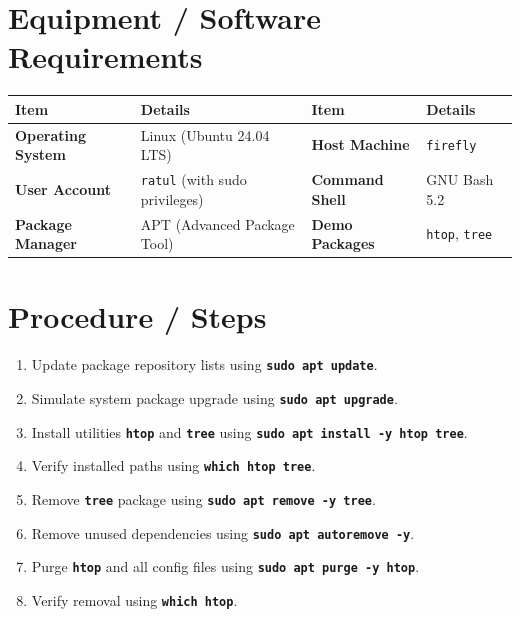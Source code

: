 \documentclass[10pt,a4paper]{article}
\newcommand{\cmd}[1]{\texttt{\textbf{#1}}}
\begin{document}
\section{Equipment / Software Requirements}
\vspace{-2pt}
\begin{table}[h!]
\centering\footnotesize
\renewcommand{\arraystretch}{1.08}
\begin{tabularx}{\linewidth}{lXlX}
\toprule
\textbf{Item} & \textbf{Details} & \textbf{Item} & \textbf{Details} \\
\midrule
\textbf{Operating System} & Linux (Ubuntu 24.04 LTS) & \textbf{Host Machine} & \texttt{firefly} \\
\textbf{User Account} & \texttt{ratul} (with sudo privileges) & \textbf{Command Shell} & GNU Bash 5.2 \\
\textbf{Package Manager} & APT (Advanced Package Tool) & \textbf{Demo Packages} & \texttt{htop}, \texttt{tree} \\
\bottomrule
\end{tabularx}
\end{table}

\section{Procedure / Steps}
\begin{enumerate}[noitemsep,topsep=1pt,leftmargin=1.4em]
  \item Update package repository lists using \cmd{sudo apt update}.
  \item Simulate system package upgrade using \cmd{sudo apt upgrade}.
  \item Install utilities \cmd{htop} and \cmd{tree} using \cmd{sudo apt install -y htop tree}.
  \item Verify installed paths using \cmd{which htop tree}.
  \item Remove \cmd{tree} package using \cmd{sudo apt remove -y tree}.
  \item Remove unused dependencies using \cmd{sudo apt autoremove -y}.
  \item Purge \cmd{htop} and all config files using \cmd{sudo apt purge -y htop}.
  \item Verify removal using \cmd{which htop}.
\end{enumerate}
\end{document}
